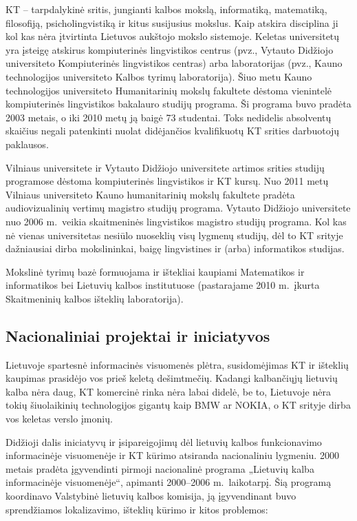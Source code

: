 \begin{multicols}{2}
KT – tarpdalykinė sritis, jungianti kalbos mokslą, informatiką, matematiką, filosofiją, psicholingvistiką ir kitus susijusius mokslus. Kaip atskira disciplina ji kol kas nėra įtvirtinta Lietuvos aukštojo mokslo sistemoje. Keletas universitetų yra įsteigę atskirus kompiuterinės lingvistikos centrus (pvz., Vytauto Didžiojo universiteto Kompiuterinės lingvistikos centras) arba laboratorijas (pvz., Kauno technologijos universiteto Kalbos tyrimų laboratorija). Šiuo metu Kauno technologijos universiteto Humanitarinių mokslų fakultete dėstoma vienintelė kompiuterinės lingvistikos bakalauro studijų programa. Ši programa buvo pradėta 2003 metais, o iki 2010 metų ją baigė 73 studentai. Toks nedidelis absolventų skaičius negali patenkinti nuolat didėjančios kvalifikuotų KT srities darbuotojų paklausos.  

    Vilniaus universitete ir Vytauto Didžiojo universitete artimos srities studijų programose dėstoma kompiuterinės lingvistikos ir KT kursų. Nuo 2011 metų Vilniaus universiteto Kauno humanitarinių mokslų fakultete pradėta audiovizualinių vertimų magistro studijų programa. Vytauto Didžiojo universitete nuo 2006 m.~veikia skaitmeninės lingvistikos magistro studijų programa. Kol kas nė vienas universitetas nesiūlo nuoseklių visų lygmenų studijų, dėl to KT srityje dažniausiai dirba mokslininkai, baigę lingvistines ir (arba) informatikos studijas. 

Mokslinė tyrimų bazė formuojama ir ištekliai kaupiami Matematikos ir informatikos bei Lietuvių kalbos institutuose (pastarajame 2010 m.~įkurta Skaitmeninių kalbos išteklių laboratorija).

\subsection{Nacionaliniai projektai ir iniciatyvos}

 Lietuvoje spartesnė informacinės visuomenės plėtra, susidomėjimas KT ir išteklių kaupimas prasidėjo vos prieš keletą dešimtmečių. Kadangi kalbančiųjų lietuvių kalba nėra daug, KT komercinė rinka nėra labai didelė, be to, Lietuvoje nėra tokių šiuolaikinių technologijos gigantų kaip BMW ar NOKIA, o KT srityje dirba vos keletas verslo įmonių.  

Didžioji dalis iniciatyvų ir įsipareigojimų dėl lietuvių kalbos funkcionavimo informacinėje visuomenėje ir KT kūrimo atsiranda nacionaliniu lygmeniu. 2000 metais pradėta įgyvendinti pirmoji nacionalinė programa „Lietuvių kalba informacinėje visuomenėje“, apimanti 2000–2006 m.~laikotarpį. Šią programą koordinavo Valstybinė lietuvių kalbos komisija, ją įgyvendinant buvo sprendžiamos lokalizavimo, išteklių kūrimo ir kitos problemos:


\end{multicols}
